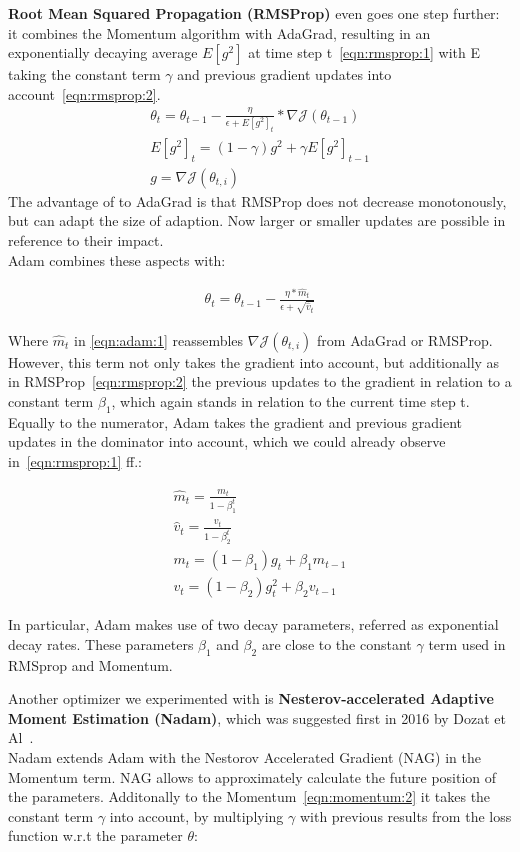 \textbf{Root Mean Squared Propagation (RMSProp)} even goes one step further: it combines the Momentum algorithm with AdaGrad,
resulting in an exponentially decaying average $E[g^2]$ at time step t~\ref{eqn:rmsprop:1} with E taking the constant term
$\gamma$ and previous gradient updates into account~\ref{eqn:rmsprop:2}.
\begin{align}
    \theta_{t} = \theta_{t-1} - \frac{\eta}{\epsilon+E[g^2]_t} * \nabla\mathcal{J}(\theta_{t-1})\label{eqn:rmsprop:1}\\
    E[g^2]_t = (1-\gamma)g^2+\gamma E[g^2]_{t-1}\label{eqn:rmsprop:2}\\
    g = \nabla\mathcal{J}(\theta_{t,i})\label{eqn:rmsprop:3}
\end{align}
The advantage of to AdaGrad is that RMSProp does not decrease monotonously, but can adapt the size of adaption.
Now larger or smaller updates are possible in reference to their impact.\\

Adam combines these aspects with:

\begin{align}
    \theta_{t} = \theta_{t-1} - \frac{\eta*\hat{m}_t}{\epsilon+\sqrt{\hat{v}_t}} \label{eqn:adam:1}
\end{align}

Where $\hat{m}_t$ in \ref{eqn:adam:1} reassembles $\nabla\mathcal{J}(\theta_{t,i})$ from AdaGrad or RMSProp.
However, this term not only takes the gradient into account, but additionally as in RMSProp~\ref{eqn:rmsprop:2} the
previous updates to the gradient in relation to a constant term $\beta_1$, which again stands in relation to the
current time step t.
Equally to the numerator, Adam takes the gradient and previous gradient updates in the dominator into account, which we
could already observe in~\ref{eqn:rmsprop:1} ff.:

\begin{align}
    \hat{m}_t = \frac{m_t}{1-\beta_1^t} \label{eqn:adam:2}\\
    \hat{v}_t = \frac{v_t}{1-\beta_2^t} \label{eqn:adam:3}\\
    m_t = (1-\beta_1)g_t + \beta_1 m_{t-1} \label{eqn:adam:4} \\
    v_t = (1-\beta_2)g_t^2 + \beta_2 v_{t-1} \label{eqn:adam:5}
\end{align}

In particular, Adam makes use of two decay parameters, referred as exponential decay rates.
These parameters $\beta_1$ and $\beta_2$ are close to the constant $\gamma$ term used in RMSprop and Momentum.\\
\par
Another optimizer we experimented with is \textbf{Nesterov-accelerated Adaptive Moment Estimation (Nadam)}, which was suggested
first in 2016 by Dozat et Al~\cite{nadam}.\\
Nadam extends Adam with the Nestorov Accelerated Gradient (NAG) in the Momentum term.
NAG allows to approximately calculate the future position of the parameters.
Additonally to the Momentum~\ref{eqn:momentum:2}
it takes the constant term $\gamma$ into account, by multiplying $\gamma$ with previous results from the loss function
w.r.t the parameter $\theta$:

